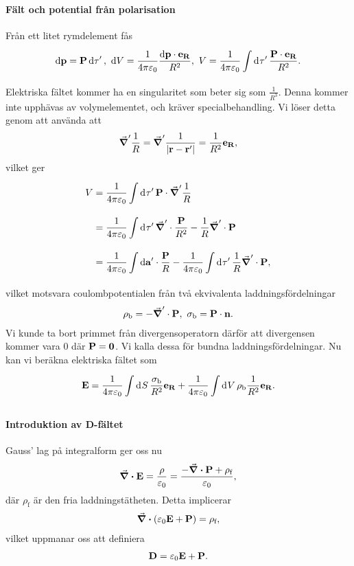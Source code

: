 \paragraph{Fält och potential från polarisation}
Från ett litet rymdelement fås
\begin{align*}
	\dd{\vb{p}} = \vb{P}\dd{\tau'},\ \dd{V} = \frac{1}{4\pi\varepsilon_{0}}\frac{\dd{\vb{p}}\cdot\vb{e}_{\vb{R}}}{R^{2}},\ V = \frac{1}{4\pi\varepsilon_{0}}\int\limits_{}^{}\dd[]{\tau'}\frac{\vb{P}\cdot\vb{e}_{\vb{R}}}{R^{2}}.
\end{align*}
Elektriska fältet kommer ha en singularitet som beter sig som $\frac{1}{R^{3}}$. Denna kommer inte upphävas av volymelementet, och kräver specialbehandling. Vi löser detta genom att använda att
\begin{align*}
	\grad'{\frac{1}{R}} = \grad'{\frac{1}{\abs{\vb{r} - \vb{r}'}}} = \frac{1}{R^{2}}\vb{e}_{\vb{R}},
\end{align*}
vilket ger
\begin{align*}
	V &= \frac{1}{4\pi\varepsilon_{0}}\int\limits_{}^{}\dd[]{\tau'}\vb{P}\cdot\grad^{\prime}{\frac{1}{R}} \\
	  &= \frac{1}{4\pi\varepsilon_{0}}\int\limits_{}^{}\dd[]{\tau'}\grad^{\prime}\cdot{\frac{\vb{P}}{R^{2}}} - \frac{1}{R}\grad^{\prime}\cdot{\vb{P}} \\
	  &= \frac{1}{4\pi\varepsilon_{0}}\int\limits_{}^{}\dd{\vb{a'}}\cdot \frac{\vb{P}}{R} - \frac{1}{4\pi\varepsilon_{0}}\int\limits_{}^{}\dd[]{\tau'}\frac{1}{R}\grad^{\prime}\cdot{\vb{P}},
\end{align*}
vilket motsvara coulombpotentialen från två ekvivalenta laddningsfördelningar
\begin{align*}
	\rho_{\text{b}} = -\grad^{\prime}\cdot{\vb{P}},\ \sigma_{\text{b}} = \vb{P}\cdot\vb{n}.
\end{align*}
Vi kunde ta bort primmet från divergensoperatorn därför att divergensen kommer vara $0$ där $\vb{P} = \vb{0}$. Vi kalla dessa för bundna laddningsfördelningar. Nu kan vi beräkna elektriska fältet som
\begin{align*}
	\vb{E} = \frac{1}{4\pi\varepsilon_{0}}\int\limits_{}^{}\dd[]{S}\frac{\sigma_{\text{b}}}{R^{2}}\vb{e}_{\vb{R}} + \frac{1}{4\pi\varepsilon_{0}}\int\limits_{}^{}\dd[]{V}\rho_{\text{b}}\frac{1}{R^{2}}\vb{e}_{\vb{R}}.
\end{align*}

\paragraph{Introduktion av D-fältet}
Gauss' lag på integralform ger oss nu
\begin{align*}
	\div{\vb{E}} = \frac{\rho}{\varepsilon_{0}} = \frac{-\div{\vb{P}} + \rho_{\text{f}}}{\varepsilon_{0}},
\end{align*}
där $\rho_{\text{f}}$ är den fria laddningstätheten. Detta implicerar
\begin{align*}
	\div(\varepsilon_{0}\vb{E} + \vb{P}) = \rho_{\text{f}},
\end{align*}
vilket uppmanar oss att definiera
\begin{align*}
	\vb{D} = \varepsilon_{0}\vb{E} + \vb{P}.
\end{align*}

